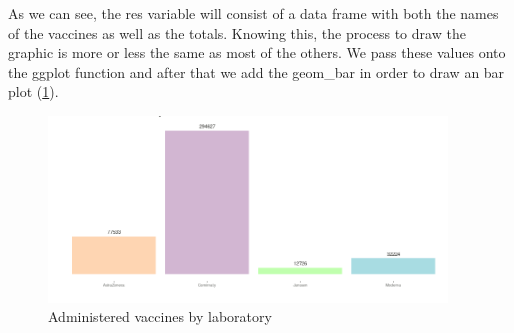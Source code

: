 As we can see, the res variable will consist of a data frame with both the names of the vaccines as well as the totals. Knowing this, the process to draw the graphic is more or less the same as most of the others. We pass these values onto the ggplot function and after that we add the geom\_bar in order to draw an bar plot (\ref{fig:diagrama3}). 

\begin{figure}[H]
\centering
\includegraphics[width=300pt,trim=10 0 0 -10mm]{images/grafico4novo.png}
\caption{Administered vaccines by laboratory}
\label{fig:diagrama3}
\end{figure}
